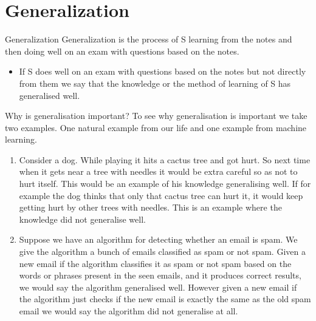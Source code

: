 \documentclass[11pt,notheorems,hyperref={pdfauthor=whatever}]{beamer}
\begin{document}
\section{Generalization}
\begin{frame}{Generalization}
\alert{Generalization} is the process of \alert{S} learning from the notes and then doing well on an exam with questions based on the notes.
\bigskip
\begin{itemize}
    \item If \alert{S} does well on an exam with questions based on the notes but not directly from them we say that the knowledge or the method of learning of \alert{S} has \alert{generalised well}. 
\end{itemize}
\end{frame}
\begin{frame}{Why is generalisation important?}
To see why generalisation is important we take two examples. One natural example from our life and one example from machine learning. 
\begin{enumerate}
    \item Consider a dog. While playing it hits a cactus tree and got hurt. So next time when it gets near a tree with needles it would be extra careful so as not to hurt itself. This would be an example of his knowledge generalising well. If for example the dog thinks that only that cactus tree can hurt it, it would keep getting hurt by other trees with needles. This is an example where the knowledge did not generalise well. 
    \item Suppose we have an algorithm for detecting whether an email is spam. We give the algorithm a bunch of emails classified as spam or not spam. Given a new email if the algorithm classifies it as spam or not spam based on the words or phrases present in the seen emails, and it produces correct results, we would say the algorithm generalised well. However given a new email if the algorithm just checks if the new email is exactly the same as the old spam email we would say the algorithm did not generalise at all.
\end{enumerate}
\end{frame}
\end{document}
